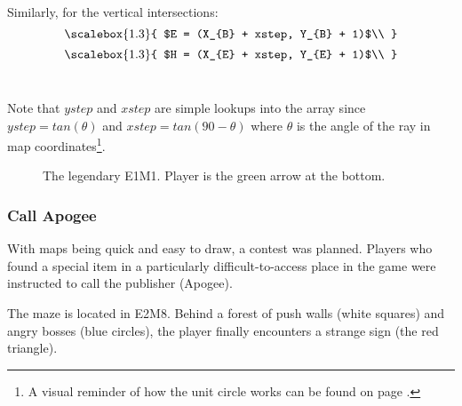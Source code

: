 \par
Similarly, for the vertical intersections:\\
  \begin{equation*}
    \scalebox{1.3}{

$E = (X_{B} + xstep, Y_{B} + 1)$\\
}
\end{equation*}
  \begin{equation*}
    \scalebox{1.3}{
$H = (X_{E} + xstep, Y_{E} + 1)$\\
}
\end{equation*}\\
\par
Note that $ystep$ and $xstep$ are simple lookups into the  array since $ystep=tan(\theta)$ and $xstep=tan(90-\theta)$ where $\theta$ is the angle of the ray in map coordinates\footnote{A visual reminder of how the unit circle works can be found on page \pageref{unit_circle_label}.}.\\
\par
\begin{figure}[H]
  \centering
 \label{mape1m1}
 \caption{The legendary E1M1. Player is the green arrow at the bottom.}
\end{figure}


\subsubsection{Call Apogee}
With maps being quick and easy to draw, a contest was planned. Players who found a special item in a particularly difficult-to-access place in the game were instructed to call the publisher (Apogee).\\
\par The maze is located in E2M8. Behind a forest of push walls (white squares) and angry bosses (blue circles), the player finally encounters a strange sign (the red triangle).


